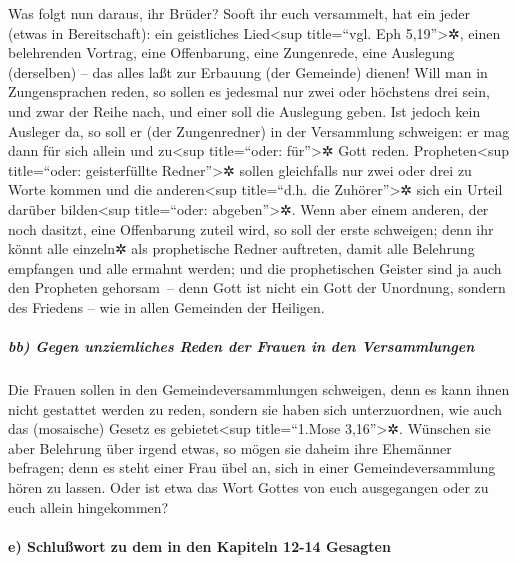  Was folgt nun daraus, ihr Brüder? Sooft ihr euch
versammelt, hat ein jeder (etwas in Bereitschaft): ein geistliches
Lied\textless sup title=``vgl. Eph 5,19''\textgreater✲, einen
belehrenden Vortrag, eine Offenbarung, eine Zungenrede, eine Auslegung
(derselben) -- das alles laßt zur Erbauung (der Gemeinde) dienen!
 Will man in Zungensprachen reden, so sollen es jedesmal
nur zwei oder höchstens drei sein, und zwar der Reihe nach, und einer
soll die Auslegung geben.  Ist jedoch kein Ausleger da,
so soll er (der Zungenredner) in der Versammlung schweigen: er mag dann
für sich allein und zu\textless sup title=``oder: für''\textgreater✲
Gott reden.  Propheten\textless sup title=``oder:
geisterfüllte Redner''\textgreater✲ sollen gleichfalls nur zwei oder
drei zu Worte kommen und die anderen\textless sup title=``d.h. die
Zuhörer''\textgreater✲ sich ein Urteil darüber bilden\textless sup
title=``oder: abgeben''\textgreater✲.  Wenn aber einem
anderen, der noch dasitzt, eine Offenbarung zuteil wird, so soll der
erste schweigen;  denn ihr könnt alle einzeln✲ als
prophetische Redner auftreten, damit alle Belehrung empfangen und alle
ermahnt werden;  und die prophetischen Geister sind ja
auch den Propheten gehorsam~--  denn Gott ist nicht ein
Gott der Unordnung, sondern des Friedens -- wie in allen Gemeinden der
Heiligen.

\hypertarget{bb-gegen-unziemliches-reden-der-frauen-in-den-versammlungen}{%
\subparagraph{bb) Gegen unziemliches Reden der Frauen in den
Versammlungen}\label{bb-gegen-unziemliches-reden-der-frauen-in-den-versammlungen}}

 Die Frauen sollen in den Gemeindeversammlungen
schweigen, denn es kann ihnen nicht gestattet werden zu reden, sondern
sie haben sich unterzuordnen, wie auch das (mosaische) Gesetz es
gebietet\textless sup title=``1.Mose 3,16''\textgreater✲.
 Wünschen sie aber Belehrung über irgend etwas, so mögen
sie daheim ihre Ehemänner befragen; denn es steht einer Frau übel an,
sich in einer Gemeindeversammlung hören zu lassen.  Oder
ist etwa das Wort Gottes von euch ausgegangen oder zu euch allein
hingekommen?

\hypertarget{e-schluuxdfwort-zu-dem-in-den-kapiteln-12-14-gesagten}{%
\paragraph{e) Schlußwort zu dem in den Kapiteln 12-14
Gesagten}\label{e-schluuxdfwort-zu-dem-in-den-kapiteln-12-14-gesagten}}

